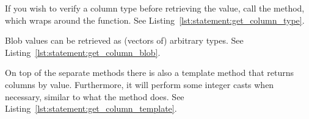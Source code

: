 If you wish to verify a column type before retrieving the value, call the  method, which wraps around the  function. See Listing~\ref{lst:statement:get_column_type}.



Blob values can be retrieved as (vectors of) arbitrary types. See Listing~\ref{lst:statement:get_column_blob}.



On top of the separate methods there is also a template method that returns columns by value. Furthermore, it will perform some integer casts when necessary, similar to what the  method does. See Listing~\ref{lst:statement:get_column_template}.

